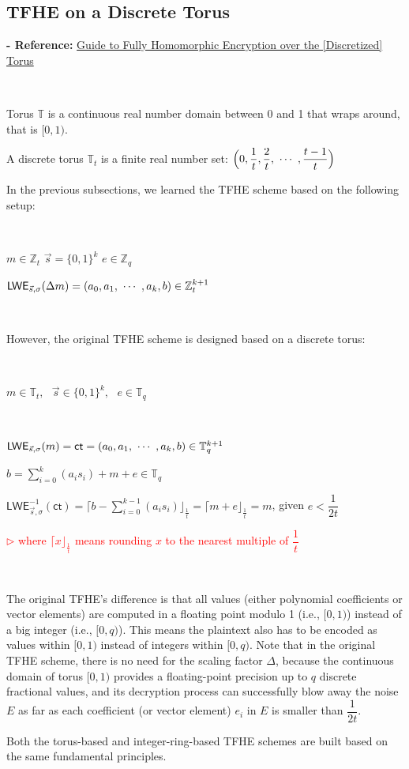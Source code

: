 \subsection{TFHE on a Discrete Torus}
\label{subsec:torus}

\textbf{- Reference:} 
\href{https://eprint.iacr.org/2021/1402.pdf}{Guide to
Fully Homomorphic Encryption
over the [Discretized] Torus}~\cite{torus}

$ $

Torus $\mathbb{T}$ is a continuous real number domain between 0 and 1 that wraps around, that is $[0, 1)$. 

A discrete torus $\mathbb{T}_t$ is a finite real number set: $\Big(0, \dfrac{1}{t}, \dfrac{2}{t}, \text{ } \text{$\cdots$} \text{ }, \dfrac{t - 1}{t}\Big)$


In the previous subsections, we learned the TFHE scheme based on the following setup:

$ $

$m \in \mathbb{Z}_t$ 
$\vec{s} = \{0, 1\}^{k}$
$e \in \mathbb{Z}_q$

$\textsf{LWE}_{\vec{s}, \sigma}(\Delta m) = (a_0, a_1, \text{ } \text{$\cdots$} \text{ }, a_k, b) \in \mathbb{Z}_t^{k + 1}$

$ $

However, the original TFHE scheme is designed based on a discrete torus:


$ $

$m \in \mathbb{T}_{t}, \text{ } \vec{s} \in \{0, 1\}^{k}, \text{ } e \in \mathbb{T}_{q}$

$ $

$\textsf{LWE}_{\vec{s}, \sigma}(m) = \textsf{ct} = (a_0, a_1, \text{ } \text{$\cdots$} \text{ }, a_k, b) \in \mathbb{T}_{q}^{k+1}$

$b = \sum\limits_{i=0}^{k}(a_is_i) + m + e \in \mathbb{T}_q$

$\textsf{LWE}_{\vec{s}, \sigma}^{-1}(\textsf{ct}) =  \Big\lceil b - \sum\limits_{i=0}^{k-1}(a_is_i) \Big\rfloor_{\frac{1}{t}} = \Big\lceil m + e \Big\rfloor_{\frac{1}{t}} = m$, given $e < \dfrac{1}{2t}$  

\textcolor{red}{ $\rhd$ where $\lceil x \rfloor_{\frac{1}{t}}$ means rounding $x$ to the nearest multiple of $\dfrac{1}{t}$}

$ $

The original TFHE's difference is that all values (either polynomial coefficients or vector elements) are computed in a floating point modulo 1 (i.e., $[0, 1)$) instead of a big integer (i.e., $[0, q)$). This means the plaintext also has to be encoded as values within $[0, 1)$ instead of integers within $[0, q)$. Note that in the original TFHE scheme, there is no need for the scaling factor $\Delta$, because the continuous domain of torus $[0, 1)$ provides a floating-point precision up to $q$ discrete fractional values, and its decryption process can successfully blow away the noise $E$ as far as each coefficient (or vector element) $e_i$ in $E$ is smaller than $\dfrac{1}{2t}$. 

Both the torus-based and integer-ring-based TFHE schemes are built based on the same fundamental principles.